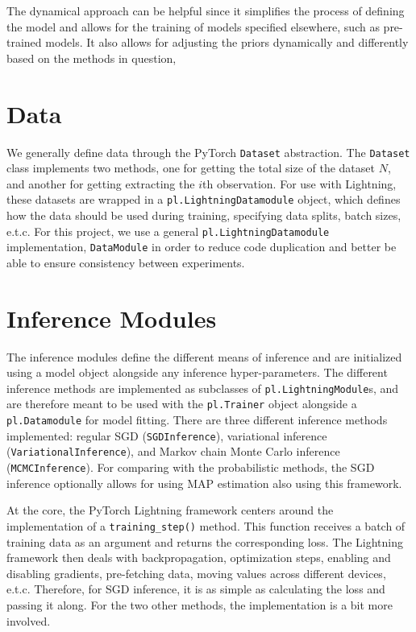 The dynamical approach can be helpful since it simplifies the process of defining the model and allows for the training of models specified elsewhere, such as pre-trained models. 
It also allows for adjusting the priors dynamically and differently based on the methods in question, 

\section{Data}
We generally define data through the PyTorch \texttt{Dataset} abstraction.
The \texttt{Dataset} class implements two methods, one for getting the total size of the dataset $N$, and another for getting extracting the $i$th observation.
For use with Lightning, these datasets are wrapped in a \texttt{pl.LightningDatamodule} object, which defines how the data should be used during training, specifying data splits, batch sizes, e.t.c.
For this project, we use a general \texttt{pl.LightningDatamodule} implementation, \texttt{DataModule} in order to reduce code duplication and better be able to ensure consistency between experiments. 

\section{Inference Modules}
The inference modules define the different means of inference and are initialized using a model object alongside any inference hyper-parameters.
The different inference methods are implemented as subclasses of \texttt{pl.LightningModule}s, and are therefore meant to be used with the \texttt{pl.Trainer} object alongside a \texttt{pl.Datamodule} for model fitting. 
There are three different inference methods implemented: regular SGD (\texttt{SGDInference}), variational inference (\texttt{VariationalInference}), and Markov chain Monte Carlo inference (\texttt{MCMCInference}).
For comparing with the probabilistic methods, the SGD inference optionally allows for using MAP estimation also using this framework.

At the core, the PyTorch Lightning framework centers around the implementation of a \texttt{training\_step()} method.
This function receives a batch of training data as an argument and returns the corresponding loss.
The Lightning framework then deals with backpropagation, optimization steps, enabling and disabling gradients, pre-fetching data, moving values across different devices, e.t.c.
Therefore, for SGD inference, it is as simple as calculating the loss and passing it along.
For the two other methods, the implementation is a bit more involved.

